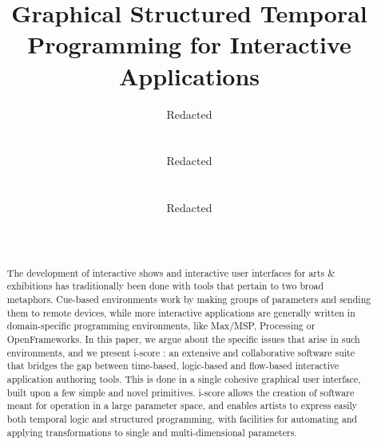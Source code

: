 \documentclass{sigchi}
\begin{document}
\title{Graphical Structured Temporal Programming for Interactive Applications}

\author{
  \alignauthor Redacted\\
    \\
    \\
  \alignauthor Redacted\\
    \\
    \\
  \alignauthor Redacted\\
    \\
    \\
}

\maketitle

\begin{abstract}
  The development of interactive shows and interactive user interfaces for arts \& exhibitions
has traditionally been done with tools that pertain to two broad metaphors. 
Cue-based environments work by making groups of parameters and sending them to remote devices, 
while more interactive applications are generally written in domain-specific 
programming environments, like Max/MSP, Processing or OpenFrameworks.
  In this paper, we argue about the specific issues that arise in such environments, and we present 
i-score : an extensive and collaborative software suite that bridges
the gap between time-based, logic-based and flow-based interactive application authoring tools. 
This is done in a single cohesive graphical user interface, built upon a few simple and novel primitives.
  i-score allows the creation of software meant for operation in a large parameter space, 
and enables artists to express easily both temporal logic and structured programming, 
with facilities for automating and applying transformations to single and multi-dimensional parameters.
\end{abstract}

\end{document}
